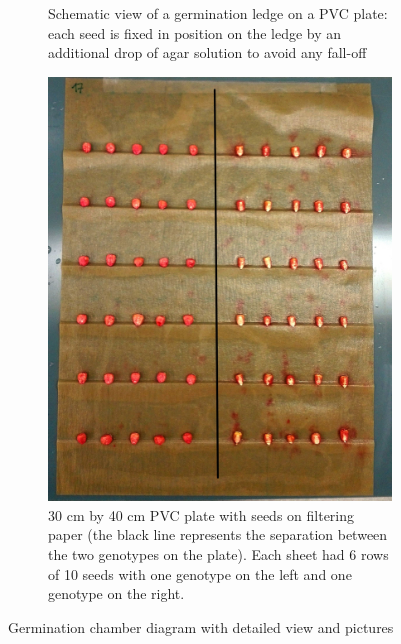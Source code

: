 \begin{figure}[!htb]
\begin{subfigure}[b]{0.475\textwidth}
            {Schematic view of a germination ledge on a PVC plate: each seed is fixed in position on the ledge by an additional 
            drop of agar solution to avoid any fall-off}    
            \label{fig:germiantion_ledge}
        \end{subfigure}
        \quad
        \begin{subfigure}[b]{0.475\textwidth}   
            \centering 
            \includegraphics[width=\textwidth]{figures/photo_germination_plate.jpg}
            \caption[]%
            {30 cm by 40 cm PVC plate with seeds on filtering paper (the black line represents the separation between the two 
           genotypes on the plate). Each sheet had 6 rows of 10 seeds with one genotype on the left and one genotype on the 
           right.}    
            \label{fig:photo_germination_plate}
        \end{subfigure}
        \caption{Germination chamber diagram with detailed view and pictures}
    \end{figure}

